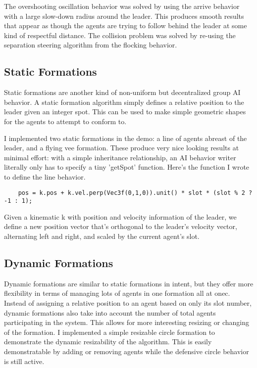\documentclass{article}
\begin{document}
The overshooting oscillation behavior was solved by using the arrive behavior
with a large slow-down radius around the leader. This produces smooth results
that appear as though the agents are trying to follow behind the leader at some
kind of respectful distance. The collision problem was solved by re-using the
separation steering algorithm from the flocking behavior.

\subsection {Static Formations}
Static formations are another kind of non-uniform but decentralized group AI
behavior. A static formation algorithm simply defines a relative position to
the leader given an integer spot. This can be used to make simple geometric
shapes for the agents to attempt to conform to.

I implemented two static formations in the demo: a line of agents abreast of
the leader, and a flying vee formation. These produce very nice looking results at minimal effort: with a simple inheritance relationship, an AI behavior writer
literally only has to specify a tiny 'getSpot' function. Here's the function I
wrote to define the line behavior.

\begin{lstlisting}
    pos = k.pos + k.vel.perp(Vec3f(0,1,0)).unit() * slot * (slot % 2 ? -1 : 1);
\end{lstlisting}
Given a kinematic k with position and velocity information of the leader, we
define a new position vector that's orthogonal to the leader's velocity vector,
alternating left and right, and scaled by the current agent's slot.

\subsection {Dynamic Formations}
Dynamic formations are similar to static formations in intent, but they offer
more flexibility in terms of managing lots of agents in one formation all at
onec. Instead of assigning a relative position to an agent based on only its
slot number, dynamic formations also take into account the number of total
agents participating in the system. This allows for more interesting resizing or
changing of the formation. I implemented a simple resizable circle formation
to demonstrate the dynamic resizability of the algorithm. This is easily
demonstratable by adding or removing agents while the defensive circle behavior
is still active.
\end{document}
